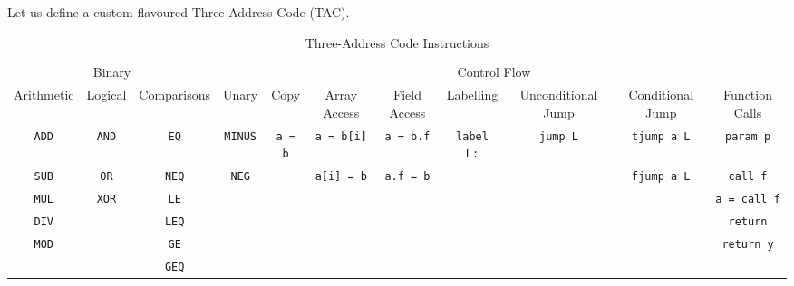 \begin{definition}
    Let us define a custom-flavoured Three-Address Code (TAC).
    
    \begin{sidewaystable}[H]
        \centering
        \setlength\tabcolsep{2.5pt}
        \scriptsize
        \begin{tabularx}{\textwidth}{c c c c c c c c c c c}
            \toprule
            \multicolumn{3}{c}{Binary} & & & & \multicolumn{3}{c}{Control Flow} & \\
            Arithmetic 
                & Logical 
                & Comparisons 
                & Unary 
                & Copy 
                & Array Access 
                & Field Access
                & Labelling
                & Unconditional Jump
                & Conditional Jump
                & Function Calls
                \\
            \midrule
            \texttt{ADD} 
                & \texttt{AND} 
                & \texttt{EQ}  
                & \texttt{MINUS} 
                & \texttt{a = b} 
                & \texttt{a = b[i]} 
                & \texttt{a = b.f} 
                & \texttt{label L:}
                & \texttt{jump L}
                & \texttt{tjump a L}
                & \texttt{param p}
                \\
            \texttt{SUB} 
                & \texttt{OR}  
                & \texttt{NEQ} 
                & \texttt{NEG}   
                &
                & \texttt{a[i] = b}
                & \texttt{a.f = b} 
                &
                &
                & \texttt{fjump a L}
                & \texttt{call f}
                \\
            \texttt{MUL} 
                & \texttt{XOR} 
                & \texttt{LE}  
                & 
                & 
                &
                &
                &
                &
                &
                & \texttt{a = call f}
                \\
            \texttt{DIV} 
                &
                & \texttt{LEQ} 
                &                
                &                
                & 
                & 
                &
                &
                &
                & \texttt{return}
                \\
            \texttt{MOD} 
                &
                & \texttt{GE}
                & 
                & 
                &
                &
                &
                &
                &
                & \texttt{return y}
                \\
            \phantom{} 
                &
                & \texttt{GEQ}
                &
                &
                &
                &
                &
                &
                &
                &
                \\
            \bottomrule
        \end{tabularx}
        \caption{Three-Address Code Instructions}
        \label{fig:tac-instructions}
    \end{sidewaystable}
\end{definition}

